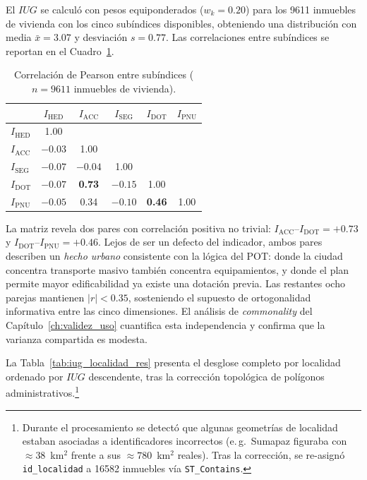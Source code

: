 \documentclass[12pt, a4paper, twoside, openright]{report}
\theoremstyle{plain}
\theoremstyle{definition}
\newcommand{\IHED}{I_{\text{HED}}} %
\newcommand{\IACC}{I_{\text{ACC}}} %
\newcommand{\ISEG}{I_{\text{SEG}}} %
\newcommand{\IDOT}{I_{\text{DOT}}} %
\newcommand{\IPNU}{I_{\text{PNU}}} %
\newcommand{\IUG}{IUG}             %
\begin{document}
El $\IUG{}$ se calculó con pesos equiponderados ($w_k = 0.20$) para los \num{9611} inmuebles de vivienda con los cinco subíndices disponibles, obteniendo una distribución con media $\bar{x} = 3.07$ y desviación $s = 0.77$. Las correlaciones entre subíndices se reportan en el Cuadro~\ref{tab:corr_matrix_res}.

\begin{table}[htbp]
\centering
\caption{Correlación de Pearson entre subíndices ($n = \num{9611}$ inmuebles de vivienda).}
\label{tab:corr_matrix_res}
\begin{tabular}{@{}lccccc@{}}
\toprule
& $\IHED$ & $\IACC$ & $\ISEG$ & $\IDOT$ & $\IPNU$ \\
\midrule
$\IHED$ & 1.00 & & & & \\
$\IACC$ & $-0.03$ & 1.00 & & & \\
$\ISEG$ & $-0.07$ & $-0.04$ & 1.00 & & \\
$\IDOT$ & $-0.07$ & \textbf{0.73} & $-0.15$ & 1.00 & \\
$\IPNU$ & $-0.05$ & 0.34 & $-0.10$ & \textbf{0.46} & 1.00 \\
\bottomrule
\end{tabular}
\end{table}

La matriz revela dos pares con correlación positiva no trivial: $\IACC$--$\IDOT = +0.73$ y $\IDOT$--$\IPNU = +0.46$. Lejos de ser un defecto del indicador, ambos pares describen un \emph{hecho urbano} consistente con la lógica del POT: donde la ciudad concentra transporte masivo también concentra equipamientos, y donde el plan permite mayor edificabilidad ya existe una dotación previa. Las restantes ocho parejas mantienen $|r| < 0.35$, sosteniendo el supuesto de ortogonalidad informativa entre las cinco dimensiones. El análisis de \emph{commonality} del Capítulo~\ref{ch:validez_uso} cuantifica esta independencia y confirma que la varianza compartida es modesta.

La Tabla~\ref{tab:iug_localidad_res} presenta el desglose completo por localidad ordenado por $\IUG$ descendente, tras la corrección topológica de polígonos administrativos.\footnote{Durante el procesamiento se detectó que algunas geometrías de localidad estaban asociadas a identificadores incorrectos (e.\,g.\ Sumapaz figuraba con $\approx 38$~km$^2$ frente a sus $\approx 780$~km$^2$ reales). Tras la corrección, se re-asignó \texttt{id\_localidad} a \num{16582} inmuebles vía \texttt{ST\_Contains}.}
\end{document}
